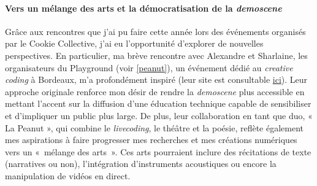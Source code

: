 \paragraph*{Vers un mélange des arts et la démocratisation de la \textit{demoscene}}
Grâce aux rencontres que j'ai pu faire cette année lors des événements organisés par le Cookie Collective, j'ai eu l'opportunité d'explorer de nouvelles perspectives. En particulier, ma brève rencontre avec Alexandre et Sharlaine, les organisateurs du Playground (voir \ref{peanut}), un événement dédié au \textit{creative coding} à Bordeaux, m'a profondément inspiré (leur site est consultable \href{https://plgrnd.cc/}{ici}). Leur approche originale renforce mon désir de rendre la \textit{demoscene} plus accessible en mettant l'accent sur la diffusion d'une éducation technique capable de sensibiliser et d'impliquer un public plus large. De plus, leur collaboration en tant que duo, « La Peanut », qui combine le \textit{livecoding}, le théâtre et la poésie, reflète également mes aspirations à faire progresser mes recherches et mes créations numériques vers un «~mélange des arts~». Ces arts pourraient inclure des récitations de texte (narratives ou non), l'intégration d'instruments acoustiques ou encore la manipulation de vidéos en direct.


